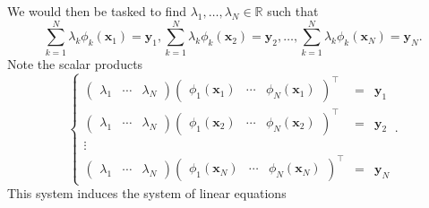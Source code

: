 \documentclass[12pt]{report} %
\newcommand{\tmmathbf}[1]{\ensuremath{\boldsymbol{#1}}}
\begin{document}
We would then be tasked to find $\lambda_1, \ldots, \lambda_N \in \mathbb{R}$
such that
\[ \sum_{k = 1}^N \lambda_k \phi_k (\tmmathbf{x}_1) =\tmmathbf{y}_1, \sum_{k =
    1}^N \lambda_k \phi_k (\tmmathbf{x}_2) =\tmmathbf{y}_2, \ldots, \sum_{k =
    1}^N \lambda_k \phi_k (\tmmathbf{x}_N) =\tmmathbf{y}_N . \]
Note the scalar products
\[ \left\{\begin{array}{cll}
    \left(\begin{array}{ccc}
              \lambda_1 & \cdots & \lambda_N
            \end{array}\right) \left(\begin{array}{ccc}
                                     \phi_1 (\tmmathbf{x}_1) & \cdots & \phi_N (\tmmathbf{x}_1)
                                   \end{array}\right)^{\top} & = & \tmmathbf{y}_1 \\
    \left(\begin{array}{ccc}
              \lambda_1 & \cdots & \lambda_N
            \end{array}\right) \left(\begin{array}{ccc}
                                     \phi_1 (\tmmathbf{x}_2) & \cdots & \phi_N (\tmmathbf{x}_2)
                                   \end{array}\right)^{\top} & = & \tmmathbf{y}_2 \\
    \vdots                                                      &   &                         \\
    \left(\begin{array}{ccc}
              \lambda_1 & \cdots & \lambda_N
            \end{array}\right) \left(\begin{array}{ccc}
                                     \phi_1 (\tmmathbf{x}_N) & \cdots & \phi_N (\tmmathbf{x}_N)
                                   \end{array}\right)^{\top} & = & \tmmathbf{y}_N
  \end{array}\right. . \]
This system induces the system of linear equations
\end{document}
